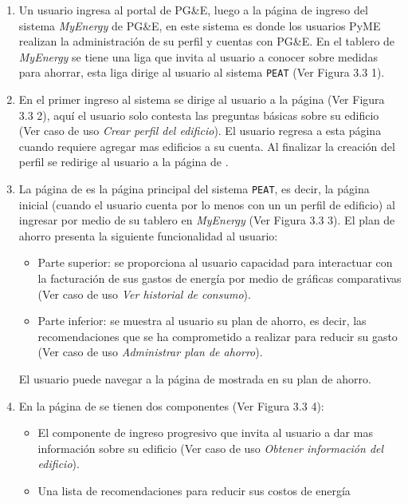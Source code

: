 \begin{enumerate}
\item Un usuario ingresa al portal de PG\&E, luego a la página de ingreso del
  sistema \textit{MyEnergy} de PG\&E, en este sistema es donde los usuarios PyME
  realizan la administración de su perfil y cuentas con PG\&E. En el tablero de
  \textit{MyEnergy} se tiene una liga que invita al usuario a conocer sobre
  medidas para ahorrar, esta liga dirige al usuario al sistema \texttt{PEAT}
  (Ver Figura 3.3 1).
\item En el primer ingreso al sistema se dirige al usuario a la página
   (Ver Figura 3.3 2), aquí el usuario
  solo contesta las preguntas básicas sobre su edificio
  (Ver caso de uso \textit{Crear perfil del edificio}).
  El usuario regresa a esta página cuando requiere agregar mas edificios a su cuenta.
  Al finalizar la creación del perfil se redirige al usuario a la página de
  .
\item La página de  es la página principal del sistema
  \texttt{PEAT}, es decir, la página inicial (cuando el usuario cuenta por lo
  menos con un un perfil de edificio) al ingresar por medio de su tablero en
  \textit{MyEnergy} (Ver Figura 3.3 3).
  El plan de ahorro presenta la siguiente funcionalidad al usuario:
  \begin{itemize}
  \item Parte superior: se proporciona al usuario capacidad para interactuar
    con la facturación de sus gastos de energía por medio de gráficas comparativas
    (Ver caso de uso \textit{Ver historial de consumo}).
  \item Parte inferior: se muestra al usuario su plan de ahorro, es decir,
    las recomendaciones que se ha comprometido a realizar para reducir su gasto
    (Ver caso de uso \textit{Administrar plan de ahorro}).
  \end{itemize}
  El usuario puede navegar a la página de 
  mostrada en su plan de ahorro.
\item En la página de  se tienen dos componentes
  (Ver Figura 3.3 4):
  \begin{itemize}
  \item El componente de ingreso progresivo que invita al usuario a
    dar mas información sobre su edificio (Ver caso de uso \textit{Obtener
      información del edificio}).
  \item Una lista de recomendaciones para reducir sus costos de energía

\end{itemize}
\end{enumerate}
